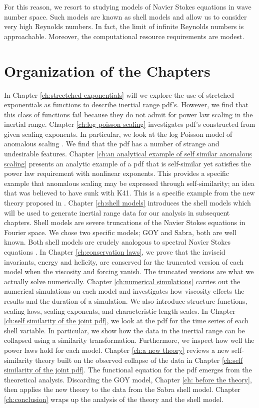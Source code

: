 For this reason, we resort to studying models of Navier Stokes equations in wave number space.  Such models are known as shell models and allow us to consider very high Reynolds numbers.  In fact, the limit of infinite Reynolds numbers is approachable.  Moreover, the computational resource requirements are modest.

\section{Organization of the Chapters}

In Chapter \ref{ch:strectched exponentials} will we explore the use of stretched exponentials as functions to describe inertial range pdf's.  However, we find that this class of functions fail because they do not admit for power law scaling in the inertial range.
Chapter \ref{ch:log poisson scaling} investigates pdf's constructed from given scaling exponents.  In particular, we look at the log Poisson model of anomalous scaling \cite{She}. We find that the pdf has a number of strange and undesirable features.
Chapter \ref{ch:an analytical example of self similar anomalous scaling} presents an analytic example of a pdf that is self-similar yet satisfies the power law requirement with nonlinear exponents.  This provides a specific example that anomalous scaling may be expressed through self-similarity; an idea that was believed to have sunk with K41.  This is a specific example from the new theory proposed in \cite{Melander2007}.
Chapter \ref{ch:shell models} introduces the shell models which will be used to generate inertial range data for our analysis in subsequent chapters. Shell models are severe truncations of the Navier Stokes equations in Fourier space.  We chose two specific models; GOY and Sabra, both are well known. Both shell models are crudely analogous to spectral Navier Stokes equations \cite{Ditlevsen, Mogensen}.
In Chapter \ref{ch:conservation laws}, we prove that the inviscid invariants, energy and helicity, are conserved for the truncated version of each model when the viscosity and forcing vanish. The truncated versions are what we actually solve numerically.
Chapter \ref{ch:numerical simulations} carries out the numerical simulations on each model and investigates how viscosity effects the results and the duration of a simulation.  We also introduce structure functions, scaling laws, scaling exponents, and characteristic length scales.
In Chapter \ref{ch:self similarity of the joint pdf}, we look at the pdf for the time series of each shell variable.  In particular, we show how the data in the inertial range can be collapsed using a similarity transformation.  Furthermore, we inspect how well the power laws hold for each model.
Chapter \ref{ch:a new theory} reviews a new self-similarity theory built on the observed collapse of the data in Chapter \ref{ch:self similarity of the joint pdf}. The functional equation for the pdf emerges from the theoretical analysis.
Discarding the GOY model, Chapter \ref{ch: before the theory}, then applies the new theory to the data from the Sabra shell model.
Chapter \ref{ch:conclusion} wraps up the analysis of the theory and the shell model. 